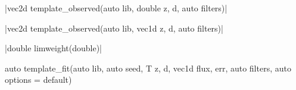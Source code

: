 \item \cppinline|vec2d template_observed(auto lib, double z, d, auto filters)| 

\cppinline|vec2d template_observed(auto lib, vec1d z, d, auto filters)|

\item \vectorfunc \cppinline|double limweight(double)| 

\item {} \begin{cppcode}
auto template_fit(auto lib, auto seed, T z, d, vec1d flux, err,
                  auto filters, auto options = default)
\end{cppcode}
